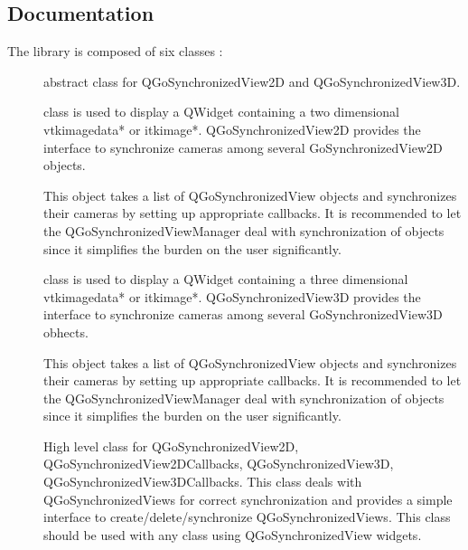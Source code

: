 \documentclass{InsightArticle}
\begin{document}
\subsection*{Documentation}
The library is composed of six classes :
\begin{description}
  \item [\href
{http://gofigure2.sourceforge.net/Doxygen/Nightly/html/classQGoSynchronizedView.
html}{QGoSynchronizedView}]
    abstract class for QGoSynchronizedView2D and QGoSynchronizedView3D.
    
  \item [\href
{http://gofigure2.sourceforge.net/Doxygen/Nightly/html/classQGoSynchronizedView2
D.html}{QGoSynchronizedView2D}]
    class is used to display a QWidget containing a two dimensional
vtkimagedata* or itkimage*. QGoSynchronizedView2D provides the interface to
synchronize cameras among several GoSynchronizedView2D objects.
    
  \item [\href
{http://gofigure2.sourceforge.net/Doxygen/Nightly/html/classQGoSynchronizedView2
DCallbacks.html}{QGoSynchronizedView2DCallbacks}]
    This object takes a list of QGoSynchronizedView objects and synchronizes
their cameras by setting up appropriate callbacks. It is recommended to let the
QGoSynchronizedViewManager deal with synchronization of objects since it
simplifies the burden on the user significantly.
    
  \item [\href
{http://gofigure2.sourceforge.net/Doxygen/Nightly/html/classQGoSynchronizedView3
D.html}{QGoSynchronizedView3D}]class is used to display a QWidget containing a
three dimensional vtkimagedata* or itkimage*. QGoSynchronizedView3D provides the
interface to synchronize cameras among several GoSynchronizedView3D obhects.
  
  \item [\href
{http://gofigure2.sourceforge.net/Doxygen/Nightly/html/classQGoSynchronizedView3
DCallbacks.html}{QGoSynchronizedView3DCallbacks}]
    This object takes a list of QGoSynchronizedView objects and synchronizes
their cameras by setting up appropriate callbacks. It is recommended to let the
QGoSynchronizedViewManager deal with synchronization of objects since it
simplifies the burden on the user significantly.
  
  \item [\href
{http://gofigure2.sourceforge.net/Doxygen/Nightly/html/classQGoSynchronizedViewM
anager.html}{QGoSynchronizedViewManager}]
  High level class for QGoSynchronizedView2D, QGoSynchronizedView2DCallbacks,
QGoSynchronizedView3D, QGoSynchronizedView3DCallbacks. This class deals with
QGoSynchronizedViews for correct synchronization and provides a simple interface
to create/delete/synchronize QGoSynchronizedViews. This class should be used
with any class using QGoSynchronizedView widgets.
  
\end{description}
\end{document}

